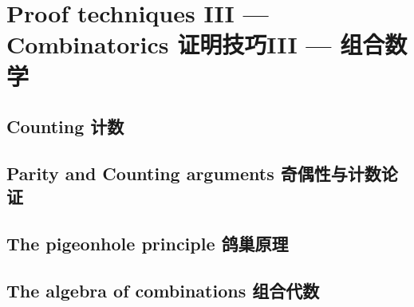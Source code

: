 \chapter{Proof techniques III --- Combinatorics 证明技巧III --- 组合数学}

\section{Counting 计数}



\clearpage

\section{Parity and Counting arguments 奇偶性与计数论证}





\clearpage


\section{The pigeonhole principle 鸽巢原理}





\clearpage

\section{The algebra of combinations 组合代数}






